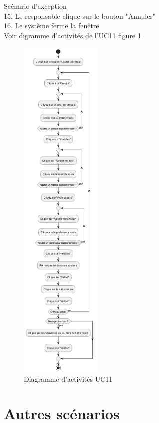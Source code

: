 \documentclass[a4paper,12pt]{article}
\begin{document}
Scénario d'exception\\
15. Le responsable clique sur le bouton "Annuler"\\
16. Le système ferme la fenêtre\\

Voir digramme d'activités de l'UC11 figure \ref{fig:act_011}.\\

\begin{figure}[h]
    \centering
    \includegraphics[width=0.35\textwidth]{Diag_activites_UC11.png}
    \caption{Diagramme d'activités UC11}
    \label{fig:act_011}
\end{figure}

\section {Autres scénarios}
\end{document}
